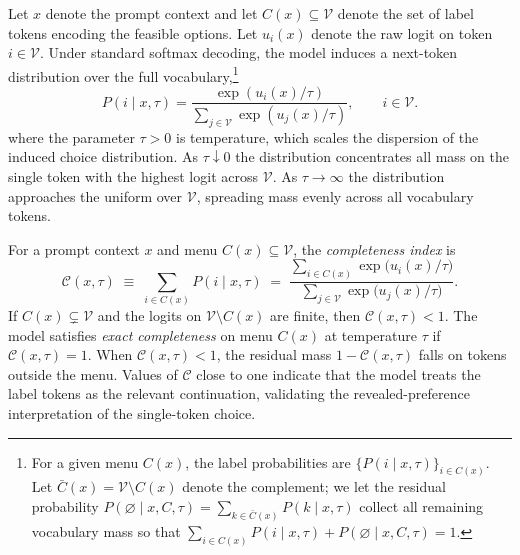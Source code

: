 Let $x$ denote the prompt context and let $C(x) \subseteq \mathcal{V}$ denote the set of label tokens encoding the feasible options. Let $u_i(x)$ denote the raw logit on token $i \in \mathcal{V}$. Under standard softmax decoding, the model induces a next-token distribution over the full vocabulary,\footnote{For a given menu $C(x)$, the label probabilities are $\{P(i \mid x, \tau)\}_{i \in C(x)}$. Let $\bar{C}(x) = \mathcal{V} \setminus C(x)$ denote the complement; we let the residual probability $P(\varnothing \mid x, C, \tau) = \sum_{k \in \bar{C}(x)} P(k \mid x, \tau)$ collect all remaining vocabulary mass so that $\sum_{i \in C(x)} P(i \mid x, \tau) + P(\varnothing \mid x, C, \tau) = 1$.}
\begin{equation}\label{eq:softmax}
  P(i \mid x, \tau)
  = \frac{\exp(u_i(x) / \tau)}{\sum_{j \in \mathcal{V}} \exp(u_j(x) / \tau)},
  \qquad i \in \mathcal{V}.
\end{equation}
where the parameter $\tau > 0$ is temperature, which scales the dispersion of the induced choice distribution. As $\tau \downarrow 0$ the distribution concentrates all mass on the single token with the highest logit across $\mathcal{V}$. As $\tau \rightarrow \infty$ the distribution approaches the uniform over $\mathcal{V}$, spreading mass evenly across all vocabulary tokens.

\begin{definition}\label{def:completeness}
  For a prompt context $x$ and menu $C(x) \subseteq \mathcal{V}$, the \emph{completeness index} is
  \begin{equation}\label{eq:completeness}
    \mathcal{C}(x, \tau) \;\equiv\; \sum_{i \in C(x)} P(i \mid x, \tau) \;=\; \frac{\sum_{i \in C(x)} \exp\!\bigl(u_i(x)/\tau\bigr)}{\sum_{j \in \mathcal{V}} \exp\!\bigl(u_j(x)/\tau\bigr)}.
  \end{equation}
  If $C(x) \subsetneq \mathcal{V}$ and the logits on $\mathcal{V} \setminus C(x)$ are finite, then $\mathcal{C}(x, \tau) < 1$. The model satisfies \emph{exact completeness} on menu $C(x)$ at temperature $\tau$ if $\mathcal{C}(x, \tau) = 1$. When $\mathcal{C}(x,\tau) < 1$, the residual mass $1 - \mathcal{C}(x,\tau)$ falls on tokens outside the menu. Values of $\mathcal{C}$ close to one indicate that the model treats the label tokens as the relevant continuation, validating the revealed-preference interpretation of the single-token choice.
\end{definition}


